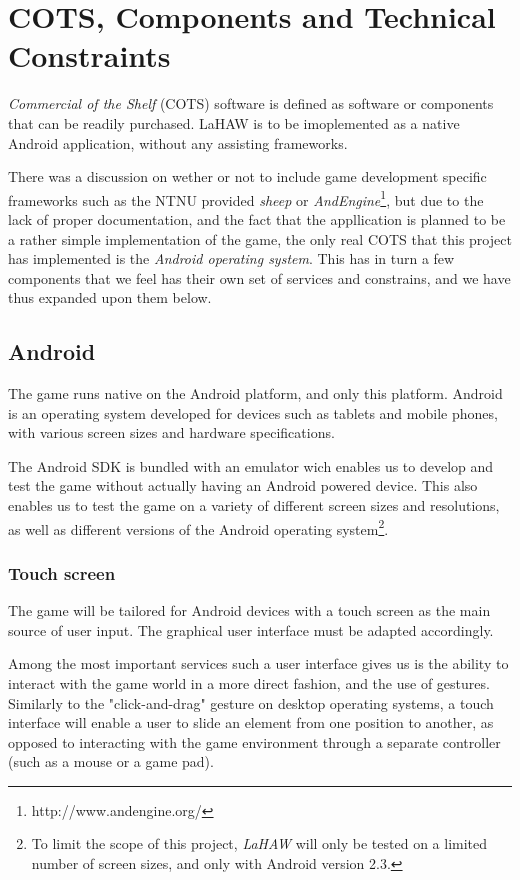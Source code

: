 \chapter{COTS, Components and Technical Constraints}
\emph{Commercial of the Shelf} (COTS) software is defined as software or components that can be readily purchased\cite{pensum}. LaHAW is to be imoplemented as a native Android application, without any assisting frameworks.

There was a discussion on wether or not to include game development specific frameworks such as the NTNU provided \emph{sheep} or \emph{AndEngine}\footnote{http://www.andengine.org/}, but due to the lack of proper documentation, and the fact that the appllication is planned to be a rather simple implementation of the game, the only real COTS that this project has implemented is the \emph{Android operating system}. This has in turn a few components that we feel has their own set of services and constrains, and we have thus expanded upon them below.


\section{Android}
The game runs native on the Android platform, and only this platform. Android is an operating system developed for devices such as tablets and mobile phones, with various screen sizes and hardware specifications.




The Android SDK is bundled with an emulator wich enables us to develop and test the game without actually having an Android powered device. This also enables us to test the game on a variety of different screen sizes and resolutions, as well as different versions of the Android operating system\footnote{To limit the scope of this project, \emph{LaHAW} will only be tested on a limited number of screen sizes, and only with Android version 2.3.}.





\subsection{Touch screen}
The game will be tailored for Android devices with a touch screen as the main source of user input. The graphical user interface must be adapted accordingly. 

Among the most important services such a user interface gives us is the ability to interact with the game world in a more direct fashion, and the use of gestures.
Similarly to the "click-and-drag" gesture on desktop operating systems, a touch interface will enable a user to slide an element from one position to another, as opposed to interacting with the game environment through a separate controller (such as a mouse or a game pad).

